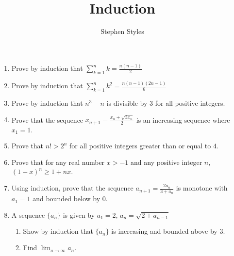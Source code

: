 \documentclass[12pt]{article}
\title{Induction}
\author{Stephen Styles}
\theoremstyle{remark}
\begin{document}
\maketitle

\begin{enumerate}

\item Prove by induction that $\displaystyle{\sum_{k=1}^n k = \frac{n(n-1)}{2}}$
\vspace{6cm}
\item Prove by induction that $\displaystyle{\sum_{k=1}^n k^2 = \frac{n(n-1)(2n-1)}{6}}$

\newpage
\item Prove by induction that $n^3-n$ is divisible by $3$ for all positive integers.
\vspace{7cm}
\item Prove that the sequence $\displaystyle{x_{n+1} = \frac{x_n + \sqrt{3x_n}}{2}}$ is an increasing sequence where $x_1 =1 $.

\newpage
\item Prove that $n! > 2^n$ for all positive integers greater than or equal to $4$. 

\vspace{7cm}
\item Prove that for any real number $x>-1$ and any positive integer $n$,\\ $(1+x)^n \geq 1 + nx$.

\newpage
\item  Using induction, prove that the sequence  $\displaystyle{a_{n+1} = \frac{2a_n}{3+a_n}}$ is monotone with\\ $a_1 = 1$ and bounded below by $0$.
\vspace{7cm}
\item A sequence $\{ a_n \}$ is given by $a_1 = 2$, $\displaystyle{a_n = \sqrt{2+a_{n-1}}}$
\begin{enumerate}
\item Show by induction that $\{ a_n \}$ is increasing and bounded above by $3$.

\item Find $\displaystyle{ \lim_{a \rightarrow \infty} a_n}$.
\end{enumerate}
\end{enumerate}
\end{document}
